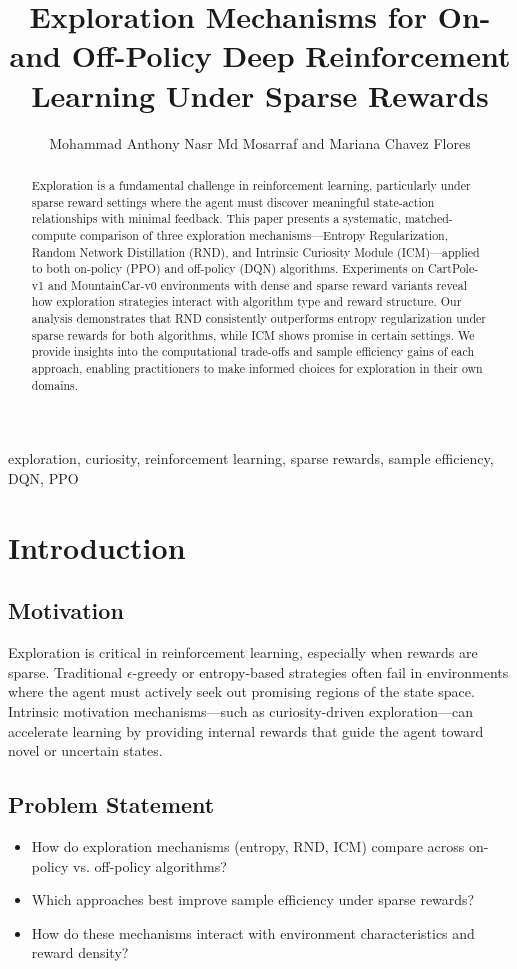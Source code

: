 \documentclass[conference]{IEEEtran}
\title{Exploration Mechanisms for On- and Off-Policy Deep Reinforcement Learning Under Sparse Rewards}
\author{
  Mohammad \IEEEmembership{Student,}
  Anthony Nasr \IEEEmembership{Student,}
  Md Mosarraf \IEEEmembership{Student,} and
  Mariana Chavez Flores \IEEEmembership{Student}
}
\begin{document}
\maketitle

\begin{abstract}
Exploration is a fundamental challenge in reinforcement learning, particularly under sparse reward settings where the agent must discover meaningful state-action relationships with minimal feedback. This paper presents a systematic, matched-compute comparison of three exploration mechanisms—Entropy Regularization, Random Network Distillation (RND), and Intrinsic Curiosity Module (ICM)—applied to both on-policy (PPO) and off-policy (DQN) algorithms. Experiments on CartPole-v1 and MountainCar-v0 environments with dense and sparse reward variants reveal how exploration strategies interact with algorithm type and reward structure. Our analysis demonstrates that RND consistently outperforms entropy regularization under sparse rewards for both algorithms, while ICM shows promise in certain settings. We provide insights into the computational trade-offs and sample efficiency gains of each approach, enabling practitioners to make informed choices for exploration in their own domains.
\end{abstract}

\begin{IEEEkeywords}
exploration, curiosity, reinforcement learning, sparse rewards, sample efficiency, DQN, PPO
\end{IEEEkeywords}

\section{Introduction}

\subsection{Motivation}
Exploration is critical in reinforcement learning, especially when rewards are sparse. Traditional $\epsilon$-greedy or entropy-based strategies often fail in environments where the agent must actively seek out promising regions of the state space. Intrinsic motivation mechanisms—such as curiosity-driven exploration—can accelerate learning by providing internal rewards that guide the agent toward novel or uncertain states.

\subsection{Problem Statement}
\begin{itemize}
  \item How do exploration mechanisms (entropy, RND, ICM) compare across on-policy vs. off-policy algorithms?
  \item Which approaches best improve sample efficiency under sparse rewards?
  \item How do these mechanisms interact with environment characteristics and reward density?
\end{itemize}
\end{document}
